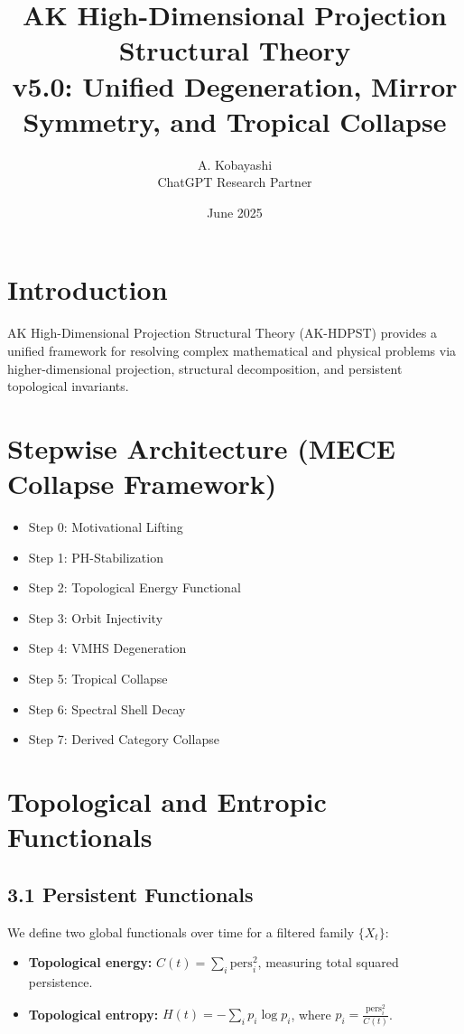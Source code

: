 \documentclass[11pt]{article}
\title{AK High-Dimensional Projection Structural Theory\\
\large v5.0: Unified Degeneration, Mirror Symmetry, and Tropical Collapse}
\author{A. Kobayashi \\ ChatGPT Research Partner}
\date{June 2025}
\begin{document}
\maketitle

\tableofcontents
\newpage


\section{Introduction}
AK High-Dimensional Projection Structural Theory (AK-HDPST) provides a unified framework for resolving complex mathematical and physical problems via higher-dimensional projection, structural decomposition, and persistent topological invariants.


\section{Stepwise Architecture (MECE Collapse Framework)}
\begin{itemize}
    \item Step 0: Motivational Lifting
    \item Step 1: PH-Stabilization
    \item Step 2: Topological Energy Functional
    \item Step 3: Orbit Injectivity
    \item Step 4: VMHS Degeneration
    \item Step 5: Tropical Collapse
    \item Step 6: Spectral Shell Decay
    \item Step 7: Derived Category Collapse
\end{itemize}


\section{Topological and Entropic Functionals}

\subsection{3.1 Persistent Functionals}

We define two global functionals over time for a filtered family $\{X_t\}$:
\begin{itemize}
  \item \textbf{Topological energy:} $C(t) = \sum_i \mathrm{pers}_i^2$, measuring total squared persistence.
  \item \textbf{Topological entropy:} $H(t) = -\sum_i p_i \log p_i$, where $p_i = \frac{\mathrm{pers}_i^2}{C(t)}$.
\end{itemize}
\end{document}
